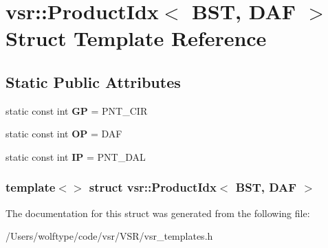\hypertarget{structvsr_1_1_product_idx_3_01_b_s_t_00_01_d_a_f_01_4}{\section{vsr\-:\-:Product\-Idx$<$ B\-S\-T, D\-A\-F $>$ Struct Template Reference}
\label{structvsr_1_1_product_idx_3_01_b_s_t_00_01_d_a_f_01_4}
}
\subsection*{Static Public Attributes}
\begin{DoxyCompactItemize}
\item 
\hypertarget{structvsr_1_1_product_idx_3_01_b_s_t_00_01_d_a_f_01_4_a704a3c68a0ec2ada795e7ef9eaef9460}{static const int {\bfseries G\-P} = P\-N\-T\-\_\-\-C\-I\-R}\label{structvsr_1_1_product_idx_3_01_b_s_t_00_01_d_a_f_01_4_a704a3c68a0ec2ada795e7ef9eaef9460}

\item 
\hypertarget{structvsr_1_1_product_idx_3_01_b_s_t_00_01_d_a_f_01_4_ae625a114140dcadf38742e46cf865b20}{static const int {\bfseries O\-P} = D\-A\-F}\label{structvsr_1_1_product_idx_3_01_b_s_t_00_01_d_a_f_01_4_ae625a114140dcadf38742e46cf865b20}

\item 
\hypertarget{structvsr_1_1_product_idx_3_01_b_s_t_00_01_d_a_f_01_4_a59802d402e96c412155cb44b038f4a2e}{static const int {\bfseries I\-P} = P\-N\-T\-\_\-\-D\-A\-L}\label{structvsr_1_1_product_idx_3_01_b_s_t_00_01_d_a_f_01_4_a59802d402e96c412155cb44b038f4a2e}

\end{DoxyCompactItemize}
\subsubsection*{template$<$$>$ struct vsr\-::\-Product\-Idx$<$ B\-S\-T, D\-A\-F $>$}



The documentation for this struct was generated from the following file\-:\begin{DoxyCompactItemize}
\item 
/\-Users/wolftype/code/vsr/\-V\-S\-R/vsr\-\_\-templates.\-h\end{DoxyCompactItemize}
